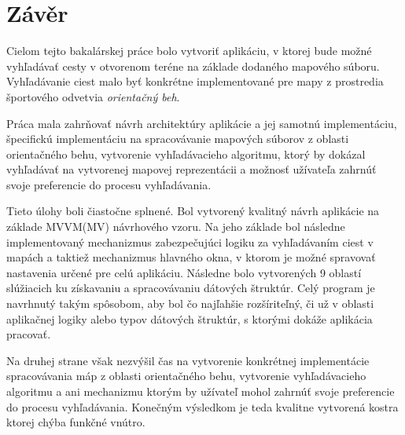\chapter*{Závěr}

Cielom tejto bakalárskej práce bolo vytvoriť aplikáciu, v ktorej bude možné vyhľadávať cesty v otvorenom teréne na základe dodaného mapového súboru. Vyhľadávanie ciest malo byť konkrétne implementované pre mapy z prostredia športového odvetvia \textit{orientačný beh}. 

Práca mala zahrňovať návrh architektúry aplikácie a jej samotnú implementáciu, špecifickú implementáciu na spracovávanie mapových súborov z oblasti orientačného behu, vytvorenie vyhľadávacieho algoritmu, ktorý by dokázal vyhľadávať na vytvorenej mapovej reprezentácii a možnosť užívateľa zahrnúť svoje preferencie do procesu vyhľadávania. 

Tieto úlohy boli čiastočne splnené. Bol vytvorený kvalitný návrh aplikácie na základe MVVM(MV) návrhového vzoru. Na jeho základe bol následne implementovaný mechanizmus zabezpečujúci logiku za vyhľadávaním ciest v mapách a taktiež mechanizmus hlavného okna, v ktorom je možné spravovať nastavenia určené pre celú aplikáciu. Následne bolo vytvorených 9 oblastí slúžiacich ku získavaniu a spracovávaniu dátových štruktúr. Celý program je navrhnutý takým spôsobom, aby bol čo najľahšie rozšíriteľný, či už v oblasti aplikačnej logiky alebo typov dátových štruktúr, s ktorými dokáže aplikácia pracovať. 

Na druhej strane však nezvýšil čas na vytvorenie konkrétnej implementácie spracovávania máp z oblasti orientačného behu, vytvorenie vyhľadávacieho algoritmu a ani mechanizmu ktorým by užívateľ mohol zahrnúť svoje preferencie do procesu vyhľadávania. Konečným výsledkom je teda kvalitne vytvorená kostra ktorej chýba funkčné vnútro.  
